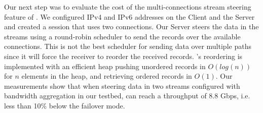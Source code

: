 

Our next step was to evaluate the cost of the multi-connections stream steering feature of \tcpls.
We configured IPv4 and IPv6 addresses on the Client and the Server and created
a \tcpls session that uses two \tcp connections. Our Server steers the data in
the \tcpls streams using a
round-robin scheduler to send the records over the available connections. This
is not the best scheduler for sending data over multiple paths~\cite{paasch2014experimental} since it will force the
receiver to reorder the received records. \tcpls’s reordering is implemented
with an efficient heap pushing unordered records in $O(log(n))$
for $n$ elements in the heap, and retrieving ordered records
in $O(1)$. Our measurements show that when steering data in two streams
configured with bandwidth aggregation in our testbed,
\tcpls can reach a throughput of 8.8 Gbps, i.e. less than 10\% below the
failover mode.

